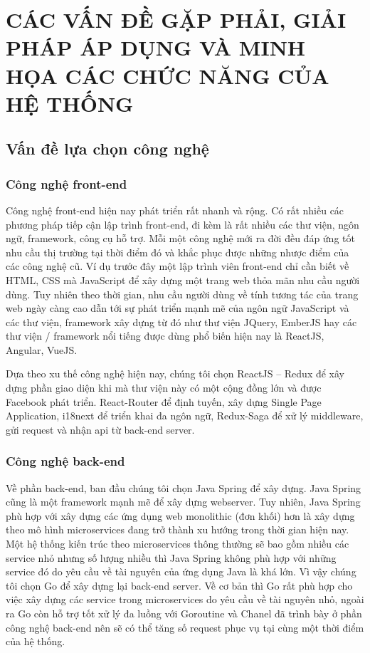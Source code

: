 \chapter{CÁC VẤN ĐỀ GẶP PHẢI, GIẢI PHÁP ÁP DỤNG VÀ MINH HỌA CÁC
CHỨC NĂNG CỦA HỆ THỐNG}
\section{Vấn đề lựa chọn công nghệ}
\subsection{Công nghệ front-end}
Công nghệ front-end hiện nay phát triển rất nhanh và rộng.
Có rất nhiều các phương pháp tiếp cận lập trình front-end, đi kèm
là rất nhiều các thư viện, ngôn ngữ, framework,
công cụ hỗ trợ. Mỗi một công nghệ mới ra đời đều đáp ứng
tốt nhu cầu thị trường tại thời điểm đó và
khắc phục được những nhược điểm của các công nghệ cũ.
Ví dụ trước đây một lập trình viên front-end chỉ cần
biết về HTML, CSS mà JavaScript để xây dựng một trang web
thỏa mãn nhu cầu người dùng. Tuy nhiên theo thời gian, nhu cầu
người dùng về tính tương tác của trang web ngày càng cao dẫn
tới sự phát triển mạnh mẽ của ngôn ngữ JavaScript và các thư viện,
framework xây dựng từ đó như thư viện JQuery, EmberJS hay các
thư viện / framework nổi tiếng được dùng phổ biến hiện nay là
ReactJS, Angular, VueJS.

Dựa theo xu thế công nghệ hiện nay, chúng tôi chọn ReactJS – Redux để
xây dựng phần giao diện khi mà thư viện này có một cộng đồng lớn
và được Facebook phát triển. React-Router để định tuyến, xây dựng
Single Page Application, i18next để triển khai đa ngôn ngữ,
Redux-Saga để xử lý middleware,
gửi request và nhận api từ back-end server. 

\subsection{Công nghệ back-end}
Về phần back-end, ban đầu chúng tôi chọn Java Spring để xây dựng.
Java Spring cũng là một framework mạnh mẽ để xây dựng webserver.
Tuy nhiên, Java Spring phù hợp với xây dựng các ứng dụng web
monolithic (đơn khối) hơn là xây dựng theo mô hình microservices
đang trở thành xu hướng trong thời gian hiện nay. Một
hệ thống kiến trúc theo microservices thông thường sẽ
bao gồm nhiều các service nhỏ nhưng số lượng nhiều thì Java
Spring không phù hợp với những service đó do yêu cầu về tài
nguyên của ứng dụng Java là khá lớn. Vì vậy chúng tôi chọn
Go để xây dựng lại back-end server. Về cơ bản thì Go rất
phù hợp cho việc xây dựng các service trong microservices
do yêu cầu về tài nguyên nhỏ, ngoài ra Go còn hỗ trợ tốt xử
lý đa luồng với Goroutine và Chanel đã trình bày ở phần
công nghệ back-end nên
sẽ có thể tăng số request phục vụ tại cùng một thời điểm của hệ thống.


